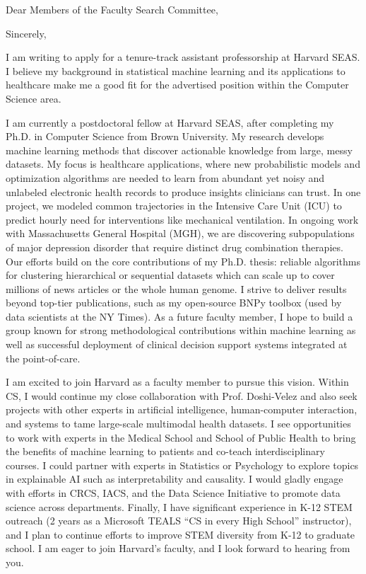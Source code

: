 \documentclass[11pt,letterpaper,roman]{moderncv}        %
\begin{document}
\date{\today}
\opening{Dear Members of the Faculty Search Committee,}
\closing{Sincerely,}

\makelettertitle

I am writing to apply for a tenure-track assistant professorship at Harvard SEAS. I believe my background in statistical machine learning and its applications to healthcare make me a good fit for the advertised position within the Computer Science area.

I am currently a postdoctoral fellow at Harvard SEAS, after completing my Ph.D. in Computer Science from Brown University.
My research develops machine learning methods
that discover actionable knowledge from large, messy datasets. 
My focus is healthcare applications, where new probabilistic models and optimization algorithms are needed to learn from abundant yet noisy and unlabeled electronic health records to produce insights clinicians can trust.
In one project, we modeled common trajectories in the Intensive Care Unit (ICU) to predict hourly need for interventions like mechanical ventilation. In ongoing work with Massachusetts General Hospital (MGH), we are discovering subpopulations of major depression disorder that require distinct drug combination therapies. Our efforts build on the core contributions of my Ph.D. thesis: reliable algorithms for clustering hierarchical or sequential datasets which can scale up to cover millions of news articles or the whole human genome.
I strive to deliver results beyond top-tier publications, such as my open-source BNPy toolbox (used by data scientists at the NY Times). As a future faculty member, I hope to build a group known for strong methodological contributions within machine learning as well as successful deployment of clinical decision support systems integrated at the point-of-care.

I am excited to join Harvard as a faculty member to pursue this vision.
Within CS, I would continue my close collaboration with Prof. Doshi-Velez and also seek projects with other experts in artificial intelligence, human-computer interaction, and systems to tame large-scale multimodal health datasets. 
I see opportunities to work with experts in the Medical School and School of Public Health to bring the benefits of machine learning to patients and co-teach interdisciplinary courses. I could partner with experts in Statistics or Psychology to explore topics in explainable AI such as interpretability and causality.
I would gladly engage with efforts in CRCS, IACS, and the Data Science Initiative to promote data science across departments.
 Finally, 
I have significant experience in K-12 STEM outreach (2 years as a Microsoft TEALS ``CS in every High School'' instructor), and I plan to continue efforts to improve STEM diversity from K-12 to graduate school.
I am eager to join Harvard's faculty, and I look forward to hearing from you.

\makeletterclosing
\end{document}
